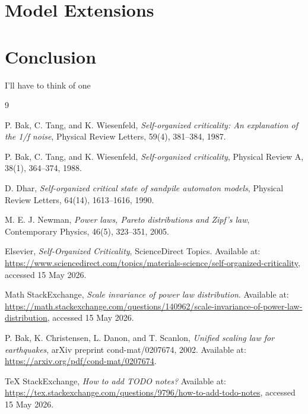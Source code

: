 \documentclass[11pt]{article}
\begin{document}
\section{Model Extensions}

\section{Conclusion}

I'll have to think of one


\begin{thebibliography}{9}

P. Bak, C. Tang, and K. Wiesenfeld,
\emph{Self-organized criticality: An explanation of the 1/f noise},
Physical Review Letters, 59(4), 381--384, 1987.

P. Bak, C. Tang, and K. Wiesenfeld,
\emph{Self-organized criticality},
Physical Review A, 38(1), 364--374, 1988.

D. Dhar,
\emph{Self-organized critical state of sandpile automaton models},
Physical Review Letters, 64(14), 1613--1616, 1990.

M. E. J. Newman,
\emph{Power laws, Pareto distributions and Zipf's law},
Contemporary Physics, 46(5), 323--351, 2005.

Elsevier,
\emph{Self-Organized Criticality},
ScienceDirect Topics.
Available at:
\url{https://www.sciencedirect.com/topics/materials-science/self-organized-criticality},
accessed 15 May 2026.

Math StackExchange,
\emph{Scale invariance of power law distribution}.
Available at:
\url{https://math.stackexchange.com/questions/140962/scale-invariance-of-power-law-distribution},
accessed 15 May 2026.

P. Bak, K. Christensen, L. Danon, and T. Scanlon,
\emph{Unified scaling law for earthquakes},
arXiv preprint cond-mat/0207674, 2002.
Available at:
\url{https://arxiv.org/pdf/cond-mat/0207674}.

TeX StackExchange,
\emph{How to add TODO notes?}
Available at:
\url{https://tex.stackexchange.com/questions/9796/how-to-add-todo-notes},
accessed 15 May 2026.

\end{thebibliography}
\end{document}
